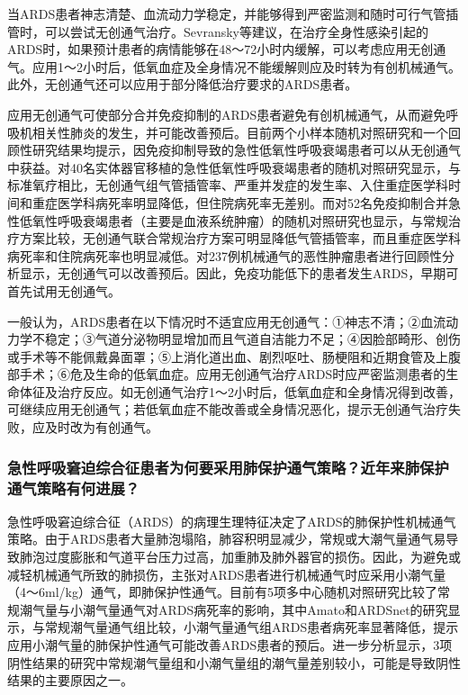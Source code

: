 当ARDS患者神志清楚、血流动力学稳定，并能够得到严密监测和随时可行气管插管时，可以尝试无创通气治疗。Sevransky等建议，在治疗全身性感染引起的ARDS时，如果预计患者的病情能够在48～72小时内缓解，可以考虑应用无创通气。应用1～2小时后，低氧血症及全身情况不能缓解则应及时转为有创机械通气。此外，无创通气还可以应用于部分降低治疗要求的ARDS患者。

应用无创通气可使部分合并免疫抑制的ARDS患者避免有创机械通气，从而避免呼吸机相关性肺炎的发生，并可能改善预后。目前两个小样本随机对照研究和一个回顾性研究结果均提示，因免疫抑制导致的急性低氧性呼吸衰竭患者可以从无创通气中获益。对40名实体器官移植的急性低氧性呼吸衰竭患者的随机对照研究显示，与标准氧疗相比，无创通气组气管插管率、严重并发症的发生率、入住重症医学科时间和重症医学科病死率明显降低，但住院病死率无差别。而对52名免疫抑制合并急性低氧性呼吸衰竭患者（主要是血液系统肿瘤）的随机对照研究也显示，与常规治疗方案比较，无创通气联合常规治疗方案可明显降低气管插管率，而且重症医学科病死率和住院病死率也明显减低。对237例机械通气的恶性肿瘤患者进行回顾性分析显示，无创通气可以改善预后。因此，免疫功能低下的患者发生ARDS，早期可首先试用无创通气。

一般认为，ARDS患者在以下情况时不适宜应用无创通气：①神志不清；②血流动力学不稳定；③气道分泌物明显增加而且气道自洁能力不足；④因脸部畸形、创伤或手术等不能佩戴鼻面罩；⑤上消化道出血、剧烈呕吐、肠梗阻和近期食管及上腹部手术；⑥危及生命的低氧血症。应用无创通气治疗ARDS时应严密监测患者的生命体征及治疗反应。如无创通气治疗1～2小时后，低氧血症和全身情况得到改善，可继续应用无创通气；若低氧血症不能改善或全身情况恶化，提示无创通气治疗失败，应及时改为有创通气。

\subsubsection{急性呼吸窘迫综合征患者为何要采用肺保护通气策略？近年来肺保护通气策略有何进展？}

急性呼吸窘迫综合征（ARDS）的病理生理特征决定了ARDS的肺保护性机械通气策略。由于ARDS患者大量肺泡塌陷，肺容积明显减少，常规或大潮气量通气易导致肺泡过度膨胀和气道平台压力过高，加重肺及肺外器官的损伤。因此，为避免或减轻机械通气所致的肺损伤，主张对ARDS患者进行机械通气时应采用小潮气量（4～6ml/kg）通气，即肺保护性通气。目前有5项多中心随机对照研究比较了常规潮气量与小潮气量通气对ARDS病死率的影响，其中Amato和ARDSnet的研究显示，与常规潮气量通气组比较，小潮气量通气组ARDS患者病死率显著降低，提示应用小潮气量的肺保护性通气可能改善ARDS患者的预后。进一步分析显示，3项阴性结果的研究中常规潮气量组和小潮气量组的潮气量差别较小，可能是导致阴性结果的主要原因之一。

